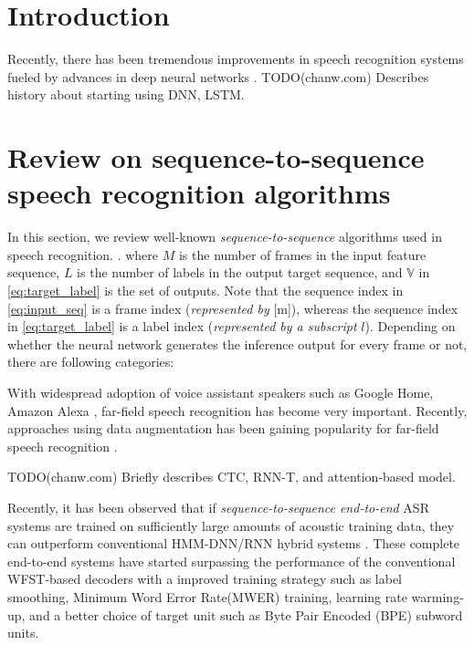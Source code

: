 \documentclass{article}
\begin{document}
\section{Introduction}
Recently, there has been tremendous improvements in speech recognition
systems fueled by advances in deep neural networks
\cite{
  Yu2013FeatureLearningDNN, 
  g_hinton_ieee_signal_processing_mag_2012,
  Seltzer2013DNNAurora4, 
  t_sainath_taslp_2017_00,
  t_sainath_book_chapter_2017_00,
  v_vanhoucke_nips_workshop_2011_00}.
TODO(chanw.com) Describes history about starting using DNN, LSTM.


\section{Review on sequence-to-sequence speech recognition algorithms}

In this section, we review well-known {\it sequence-to-sequence} algorithms
used in speech recognition.
\cite{
j_chorowski_nips_2015_00, 
a_graves_corr_2012_00, 
y_he_icassp_2019_00,
r_prabhavalkar_interspeech_2017_00}. 
where $M$ is the number of frames in the input feature sequence,
$L$ is the number of labels in the output target sequence,
 and $\mathbb{V}$ in \eqref{eq:target_label} is the set of outputs.
Note that the sequence index in \eqref{eq:input_seq} is a frame
index ({\it represented by} [m]), 
whereas the sequence index in \eqref{eq:target_label} is 
a label index ({\it represented by a subscript} $l$). 
Depending on whether the neural network generates
the inference output for every frame or not, there are following
categories:



With widespread adoption of voice assistant speakers
such as Google Home, Amazon Alexa
\cite{B_Li_INTERSPEECH_2017_1, C_Kim_INTERSPEECH_2017_1},
far-field speech recognition has become very important.
Recently, approaches using data augmentation
has been gaining popularity for far-field speech recognition
\cite{R_Lippmann_icassp_1987_1,
c_kim_interspeech_2018_00, w_hartmann_interspeech_2016_00}.

TODO(chanw.com) Briefly describes CTC, RNN-T, and attention-based model.

Recently, it has been observed that if 
{\it sequence-to-sequence end-to-end} ASR systems are trained on sufficiently 
large amounts of acoustic training data, they can outperform
conventional HMM-DNN/RNN hybrid systems \cite{c_chiu_icassp_2018_00, 
c_kim_interspeech_2019_00}.
These complete end-to-end systems have started surpassing the performance of
the conventional WFST-based decoders with a improved training strategy
such as label smoothing, Minimum Word Error Rate(MWER) training, 
learning rate warming-up,
and a better choice of target unit such as Byte Pair Encoded (BPE) 
\cite {r_sennrich_acl_2016_00} subword units.
\end{document}
